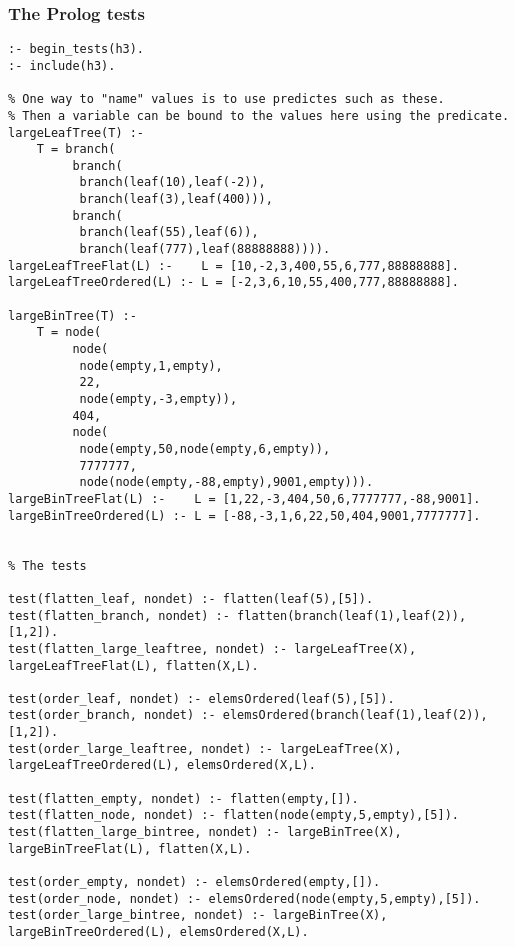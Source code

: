 \documentclass[11pt]{article}
\begin{document}
\subsubsection*{The Prolog tests}
\label{sec:orgc6e83ae}
\begin{verbatim}
:- begin_tests(h3).
:- include(h3).

% One way to "name" values is to use predictes such as these.
% Then a variable can be bound to the values here using the predicate.
largeLeafTree(T) :-
    T = branch(
         branch(
          branch(leaf(10),leaf(-2)),
          branch(leaf(3),leaf(400))),
         branch(
          branch(leaf(55),leaf(6)),
          branch(leaf(777),leaf(88888888)))).
largeLeafTreeFlat(L) :-    L = [10,-2,3,400,55,6,777,88888888].
largeLeafTreeOrdered(L) :- L = [-2,3,6,10,55,400,777,88888888].

largeBinTree(T) :-
    T = node(
         node(
          node(empty,1,empty),
          22,
          node(empty,-3,empty)),
         404,     
         node(
          node(empty,50,node(empty,6,empty)),
          7777777,
          node(node(empty,-88,empty),9001,empty))).
largeBinTreeFlat(L) :-    L = [1,22,-3,404,50,6,7777777,-88,9001].
largeBinTreeOrdered(L) :- L = [-88,-3,1,6,22,50,404,9001,7777777].


% The tests

test(flatten_leaf, nondet) :- flatten(leaf(5),[5]).
test(flatten_branch, nondet) :- flatten(branch(leaf(1),leaf(2)),[1,2]).
test(flatten_large_leaftree, nondet) :- largeLeafTree(X), largeLeafTreeFlat(L), flatten(X,L).

test(order_leaf, nondet) :- elemsOrdered(leaf(5),[5]).
test(order_branch, nondet) :- elemsOrdered(branch(leaf(1),leaf(2)),[1,2]).
test(order_large_leaftree, nondet) :- largeLeafTree(X), largeLeafTreeOrdered(L), elemsOrdered(X,L).

test(flatten_empty, nondet) :- flatten(empty,[]).
test(flatten_node, nondet) :- flatten(node(empty,5,empty),[5]).
test(flatten_large_bintree, nondet) :- largeBinTree(X), largeBinTreeFlat(L), flatten(X,L).

test(order_empty, nondet) :- elemsOrdered(empty,[]).
test(order_node, nondet) :- elemsOrdered(node(empty,5,empty),[5]).
test(order_large_bintree, nondet) :- largeBinTree(X), largeBinTreeOrdered(L), elemsOrdered(X,L).
\end{verbatim}
\end{document}
